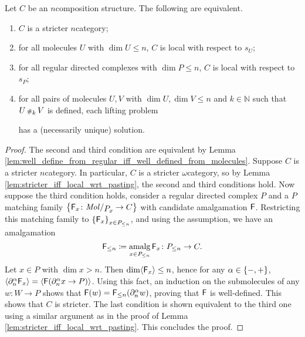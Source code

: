 \begin{lem} \label{lem:stricter_n_iff_local_with_dim_le_n}
    Let \( C \) be an \( n \)\nbd composition structure.
    The following are equivalent.
    \begin{enumerate}
        \item \( C \) is a stricter \( n \)\nbd category;
        \item for all molecules \( U \) with \( \dim U \le n \), \( C \) is local with respect to \( s_U \);
        \item for all regular directed complexes with \( \dim P \le n \), \( C \) is local with respect to \( s_P \);
        \item for all pairs of molecules \( U, V \) with \( \dim U, \dim V \le n \) and \( k \in \mathbb{N} \) such that \( U \cp{k} V \) is defined, each lifting problem
            \begin{center}
            \end{center}
            has a (necessarily unique) solution.
    \end{enumerate}
\end{lem}
\begin{proof}
    The second and third condition are equivalent by Lemma \ref{lem:well_define_from_regular_iff_well_defined_from_molecules}.
    Suppose \( C \) is a stricter \( n \)\nbd category.
    In particular, \( C \) is a stricter \( \omega \)\nbd category, so by Lemma \ref{lem:stricter_iff_local_wrt_pasting}, the second and third conditions hold.
    Now suppose the third condition holds, consider a regular directed complex \( P \) and a \( P \)\nbd matching family \( \set{\F_x \colon \molecin{\imel{P}{x}} \to C} \) with candidate amalgamation \( \F \).
    Restricting this matching family to \( \set{\F_x}_{x \in \gr{\le n}{P}} \), and using the assumption, we have an amalgamation 
    \begin{equation*}
        \gr{\le n}{\F} \eqdef \amalg_{x \in \gr{\le n}{P}} \F_x \colon \gr{\le n}{P} \to C.
    \end{equation*}
    Let \( x \in P \) with \( \dim x > n \).
    Then \( \dim \pcell{\F_x} \le n \), hence for any \( \a \in \set{-, +} \), \( \pcell{\bd{n}{\a} \F_x} = \pcell{\F(\bd{n}{\a} x \to P)} \).
    Using this fact, an induction on the submolecules of any \( w \colon W \to P \) shows that \( \F(w) = \gr{\le n}{\F}(\bd{n}{\a} w) \), proving that \( \F \) is well-defined.
    This shows that \( C \) is stricter.
    The last condition is shown equivalent to the third one using a similar argument as in the proof of Lemma \ref{lem:stricter_iff_local_wrt_pasting}.
    This concludes the proof.
\end{proof}

